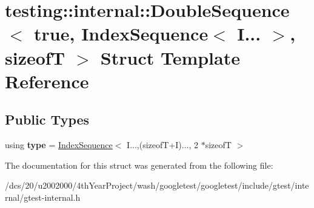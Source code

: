 \hypertarget{structtesting_1_1internal_1_1DoubleSequence_3_01true_00_01IndexSequence_3_01I_8_8_8_01_4_00_01sizeofT_01_4}{}\section{testing\+:\+:internal\+:\+:Double\+Sequence$<$ true, Index\+Sequence$<$ I... $>$, sizeofT $>$ Struct Template Reference}
\label{structtesting_1_1internal_1_1DoubleSequence_3_01true_00_01IndexSequence_3_01I_8_8_8_01_4_00_01sizeofT_01_4}
\subsection*{Public Types}
\begin{DoxyCompactItemize}
\item 
\mbox{\label{structtesting_1_1internal_1_1DoubleSequence_3_01true_00_01IndexSequence_3_01I_8_8_8_01_4_00_01sizeofT_01_4_a6f0fbcc14f5264c7db52f3ba3e264545}} 
using {\bfseries type} = \mbox{\hyperlink{structtesting_1_1internal_1_1IndexSequence}{Index\+Sequence}}$<$ I...,(sizeofT+I)..., 2 $\ast$sizeofT $>$
\end{DoxyCompactItemize}


The documentation for this struct was generated from the following file\+:\begin{DoxyCompactItemize}
\item 
/dcs/20/u2002000/4th\+Year\+Project/wash/googletest/googletest/include/gtest/internal/gtest-\/internal.\+h\end{DoxyCompactItemize}
